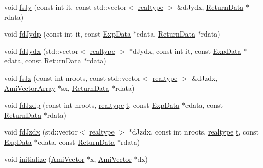 \begin{DoxyCompactItemize}
\item 
void \mbox{\hyperlink{classamici_1_1_model_a5fb9c238393913d05fed401af5b7f201}{fs\+Jy}} (const int it, const std\+::vector$<$ \mbox{\hyperlink{namespaceamici_a1bdce28051d6a53868f7ccbf5f2c14a3}{realtype}} $>$ \&d\+Jydx, \mbox{\hyperlink{classamici_1_1_return_data}{Return\+Data}} $\ast$rdata)
\item 
void \mbox{\hyperlink{classamici_1_1_model_a6aaa9335fd78ec5e450665bc70de3196}{fd\+Jydp}} (const int it, const \mbox{\hyperlink{classamici_1_1_exp_data}{Exp\+Data}} $\ast$edata, \mbox{\hyperlink{classamici_1_1_return_data}{Return\+Data}} $\ast$rdata)
\item 
void \mbox{\hyperlink{classamici_1_1_model_a7f392b9e7de5dff5082768c465a1d753}{fd\+Jydx}} (std\+::vector$<$ \mbox{\hyperlink{namespaceamici_a1bdce28051d6a53868f7ccbf5f2c14a3}{realtype}} $>$ $\ast$d\+Jydx, const int it, const \mbox{\hyperlink{classamici_1_1_exp_data}{Exp\+Data}} $\ast$edata, const \mbox{\hyperlink{classamici_1_1_return_data}{Return\+Data}} $\ast$rdata)
\item 
void \mbox{\hyperlink{classamici_1_1_model_aa1f1b2d47c20bcf7147cd3b9149109d3}{fs\+Jz}} (const int nroots, const std\+::vector$<$ \mbox{\hyperlink{namespaceamici_a1bdce28051d6a53868f7ccbf5f2c14a3}{realtype}} $>$ \&d\+Jzdx, \mbox{\hyperlink{classamici_1_1_ami_vector_array}{Ami\+Vector\+Array}} $\ast$sx, \mbox{\hyperlink{classamici_1_1_return_data}{Return\+Data}} $\ast$rdata)
\item 
void \mbox{\hyperlink{classamici_1_1_model_a86a7134f894b152a68f904b22cee04d1}{fd\+Jzdp}} (const int nroots, \mbox{\hyperlink{namespaceamici_a1bdce28051d6a53868f7ccbf5f2c14a3}{realtype}} \mbox{\hyperlink{classamici_1_1_model_a711281d57e9710226face29151cc4641}{t}}, const \mbox{\hyperlink{classamici_1_1_exp_data}{Exp\+Data}} $\ast$edata, const \mbox{\hyperlink{classamici_1_1_return_data}{Return\+Data}} $\ast$rdata)
\item 
void \mbox{\hyperlink{classamici_1_1_model_a588e7cb4790ce3b77700a3acef1c43fc}{fd\+Jzdx}} (std\+::vector$<$ \mbox{\hyperlink{namespaceamici_a1bdce28051d6a53868f7ccbf5f2c14a3}{realtype}} $>$ $\ast$d\+Jzdx, const int nroots, \mbox{\hyperlink{namespaceamici_a1bdce28051d6a53868f7ccbf5f2c14a3}{realtype}} \mbox{\hyperlink{classamici_1_1_model_a711281d57e9710226face29151cc4641}{t}}, const \mbox{\hyperlink{classamici_1_1_exp_data}{Exp\+Data}} $\ast$edata, const \mbox{\hyperlink{classamici_1_1_return_data}{Return\+Data}} $\ast$rdata)
\item 
void \mbox{\hyperlink{classamici_1_1_model_a4d8f308f15a126dde571f2e26787d3e8}{initialize}} (\mbox{\hyperlink{classamici_1_1_ami_vector}{Ami\+Vector}} $\ast$x, \mbox{\hyperlink{classamici_1_1_ami_vector}{Ami\+Vector}} $\ast$dx)

\end{DoxyCompactItemize}
